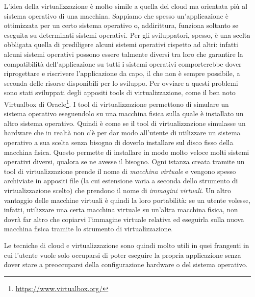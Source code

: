     L'idea della virtualizzazione è molto simile a quella del cloud ma orientata più al sistema operativo di una macchina. Sappiamo che spesso un'applicazione è ottimizzata per un certo sistema operativo o, addirittura, funziona soltanto se eseguita su determinati sistemi operativi. Per gli sviluppatori, spesso, è una scelta obbligata quella di prediligere alcuni sistemi operativi rispetto ad altri: infatti alcuni sistemi operativi possono essere talmente diversi tra loro che garantire la compatibilità dell'applicazione su tutti i sistemi operativi comporterebbe dover riprogettare e riscrivere l'applicazione da capo, il che non è sempre possibile, a seconda delle risorse disponibili per lo sviluppo. Per ovviare a questi problemi sono stati sviluppati degli appositi tools di virtualizzazione, come il ben noto Virtualbox di Oracle\footnote{\url{https://www.virtualbox.org/}}. I tool di virtualizzazione permettono di simulare un sistema operativo eseguendolo su una macchina fisica sulla quale è installato un altro sistema operativo. Quindi è come se il tool di virtualizzazione simulasse un hardware che in realtà non c'è per dar modo all'utente di utilizzare un sistema operativo a sua scelta senza bisogno di doverlo installare sul disco fisso della macchina fisica. Questo permette di installare in modo molto veloce molti sistemi operativi diversi, qualora se ne avesse il bisogno. Ogni istanza creata tramite un tool di virtualizzazione prende il nome di \textit{macchina virtuale} e vengono spesso archiviate in appositi file (la cui estensione varia a seconda dello strumento di virtualizzazione scelto) che prendono il nome di \textit{immagini virtuali}. Un altro vantaggio delle macchine virtuali è quindi la loro portabilità: se un utente volesse, infatti, utilizzare una certa macchina virtuale su un'altra macchina fisica, non dovrà far altro che copiarvi l'immagine virtuale relativa ed eseguirla sulla nuova macchina fisica tramite lo strumento di virtualizzazione.
    
    Le tecniche di cloud e virtualizzazione sono quindi molto utili in quei frangenti in cui l'utente vuole solo occuparsi di poter eseguire la propria applicazione senza dover stare a preoccuparsi della configurazione hardware o del sistema operativo.
    
